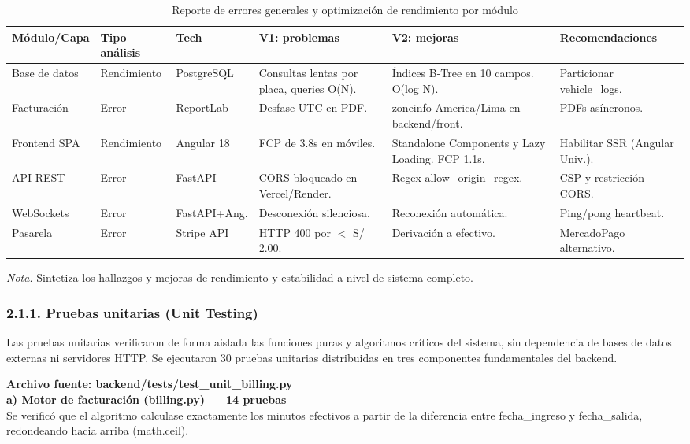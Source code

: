 \begin{table}[htbp]
\caption{Reporte de errores generales y optimización de rendimiento por módulo}
\label{tab:errores_generales}
\begin{tabular}{@{}p{2.5cm} p{2cm} p{2cm} p{3.5cm} p{3cm} p{3cm}@{}}
\toprule
\textbf{Módulo/Capa} & \textbf{Tipo análisis} & \textbf{Tech} & \textbf{V1: problemas} & \textbf{V2: mejoras} & \textbf{Recomendaciones} \\
\midrule
Base de datos & Rendimiento & PostgreSQL & Consultas lentas por placa, queries O(N). & Índices B-Tree en 10 campos. O(log N). & Particionar vehicle\_logs. \\
Facturación & Error & ReportLab & Desfase UTC en PDF. & zoneinfo America/Lima en backend/front. & PDFs asíncronos. \\
Frontend SPA & Rendimiento & Angular 18 & FCP de 3.8s en móviles. & Standalone Components y Lazy Loading. FCP 1.1s. & Habilitar SSR (Angular Univ.). \\
API REST & Error & FastAPI & CORS bloqueado en Vercel/Render. & Regex allow\_origin\_regex. & CSP y restricción CORS. \\
WebSockets & Error & FastAPI+Ang. & Desconexión silenciosa. & Reconexión automática. & Ping/pong heartbeat. \\
Pasarela & Error & Stripe API & HTTP 400 por $<$ S/ 2.00. & Derivación a efectivo. & MercadoPago alternativo. \\
\bottomrule
\end{tabular}
\par\vspace{0.2cm}
\textit{Nota.} Sintetiza los hallazgos y mejoras de rendimiento y estabilidad a nivel de sistema completo.
\end{table}

\subsubsection{2.1.1. Pruebas unitarias (Unit Testing)}




Las pruebas unitarias verificaron de forma aislada las funciones puras y algoritmos críticos del sistema, sin dependencia de bases de datos externas ni servidores HTTP. Se ejecutaron 30 pruebas unitarias distribuidas en tres componentes fundamentales del backend.

\textbf{Archivo fuente: backend/tests/test\_unit\_billing.py} \\
\textbf{a) Motor de facturación (billing.py) — 14 pruebas}\\
Se verificó que el algoritmo calculase exactamente los minutos efectivos a partir de la diferencia entre fecha\_ingreso y fecha\_salida, redondeando hacia arriba (math.ceil).

